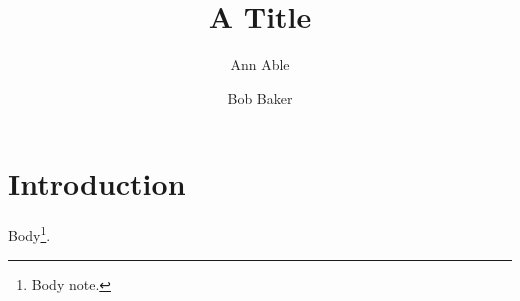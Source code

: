 \documentclass{article}
\title{A Title}
\author{Ann Able \and Bob Baker\footnotemark[2]}
\begin{document}
\section{Introduction}
Body\footnote{Body note.}.
\end{document}

